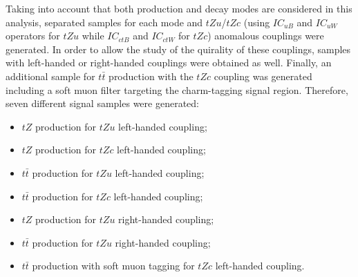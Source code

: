 Taking into account that both production and decay modes are considered in this analysis, separated samples for each mode and $tZu$/$tZc$ (using $IC_{uB}$ and $IC_{uW}$ operators for $tZu$ while $IC_{ctB}$ and $IC_{ctW}$ for $tZc$) anomalous couplings were generated. In order to allow the study of the quirality of these couplings, samples with left-handed or right-handed couplings were obtained as well. Finally, an additional sample for $t\bar{t}$ production with the $tZc$ coupling was generated including a soft muon filter targeting the charm-tagging signal region. Therefore, seven different signal samples were generated:
\begin{itemize}
	\item $tZ$ production for $tZu$ left-handed coupling; 
	\item $tZ$ production for $tZc$ left-handed coupling; 
	\item $t\bar{t}$ production for $tZu$ left-handed coupling; 
	\item $t\bar{t}$ production for $tZc$ left-handed coupling; 
	\item $tZ$ production for $tZu$ right-handed coupling; 
	\item $t\bar{t}$ production for $tZu$ right-handed coupling; 
	\item $t\bar{t}$ production with soft muon tagging for $tZc$ left-handed coupling. 
\end{itemize}


